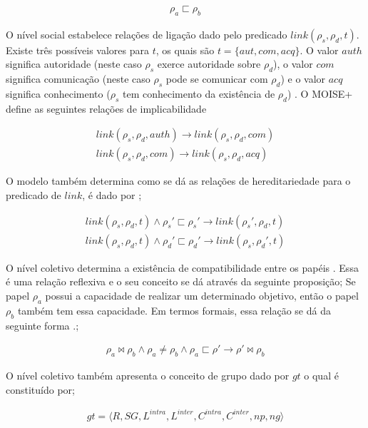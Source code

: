 \begin{eqnarray}
\rho_a \sqsubset \rho_b
\end{eqnarray}

O nível social estabelece relações de ligação dado pelo predicado $link(\rho_s,\rho_d,t)$. Existe três possíveis valores para $t$, os quais são $t = \{aut, com, acq\}$. O valor $auth$ significa autoridade (neste caso $\rho_s$ exerce autoridade sobre $\rho_d$), o valor $com$ significa comunicação (neste caso $\rho_s$ pode se comunicar com $\rho_d$) e o valor $acq$ significa conhecimento 
($\rho_s$ tem conhecimento da existência de $\rho_d$) \cite{moiseframework} \cite{moiseframeworktwo} \cite{dynamicagenttemporalstruct}. O MOISE+ define as seguintes relações de implicabilidade

\begin{eqnarray}\nonumber
	link(\rho_s,\rho_d,auth) \to link(\rho_s,\rho_d,com) \nonumber \\
	link(\rho_s,\rho_d,com) \to link(\rho_s,\rho_d,acq) 
\end{eqnarray}

O modelo também determina como se dá as relações de hereditariedade para o predicado de $link$, é dado por \cite{moiseframework} \cite{dynamicagenttemporalstruct}; 

\begin{eqnarray}\nonumber
	link(\rho_s,\rho_d,t) \wedge \rho_s' \sqsubset \rho_s' \to link(\rho_s',\rho_d,t) \nonumber \\
	link(\rho_s,\rho_d,t) \wedge \rho_d' \sqsubset \rho_d' \to link(\rho_s,\rho_d',t) 	
\end{eqnarray}


O nível coletivo determina a existência de compatibilidade entre os papéis \cite{moiseframework}. Essa é uma relação reflexiva e o seu conceito se dá através da seguinte proposição; Se papel $\rho_a$ possui a capacidade de realizar um determinado objetivo, então o papel $\rho_b$ também tem essa capacidade. Em termos formais, essa relação se dá da seguinte forma \cite{moiseframework} \cite{deonticOne}.;

\begin{eqnarray}
	\rho_a \bowtie \rho_b \wedge \rho_a \neq \rho_b \wedge \rho_a \sqsubset \rho' \to \rho' \bowtie \rho_b 
\end{eqnarray}

O nível coletivo também apresenta o conceito de grupo dado por $gt$ o qual é constituído por;

\begin{eqnarray}
	gt = \langle R,SG,L^{intra},L^{inter},C^{intra},C^{inter},np,ng\rangle 
\end{eqnarray}

